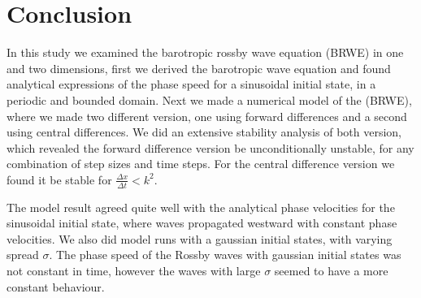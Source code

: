 \section{Conclusion}
In this study we examined the barotropic rossby wave equation (BRWE) in one and
two dimensions, first we derived
the barotropic wave equation and found analytical expressions of the phase
speed for a sinusoidal initial state, in a periodic and bounded domain.
Next we made a numerical model of the (BRWE), where we made two different
version, one using forward differences and a second using central differences.
We did an extensive stability analysis of both version, which revealed the
forward difference version be unconditionally unstable, for any combination of
step sizes and time steps. For the central difference version we found it be
stable for $\frac{\Delta x}{\Delta t} < k^2$. 

The model result agreed quite well with the analytical phase velocities for the
sinusoidal initial state, where waves propagated westward with constant
phase velocities. We also did model runs with a gaussian initial states, with
varying spread $\sigma$. The phase speed of the Rossby waves with gaussian
initial states was not constant in time, however the waves with large $\sigma$
seemed to have a more constant behaviour. 